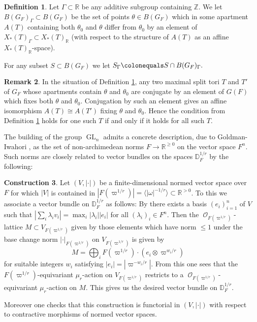 \documentclass{article}
\DeclareMathOperator{\Oc}{\mathcal{O}}
\DeclareMathOperator{\CO}{\mathcal{O}}
\DeclareMathOperator{\GL}{GL}
\newcommand{\BR}{{\mathbb{R}}}
\newcommand{\BZ}{{\mathbb{Z}}}
\newcommand{\Dr}[1][r]{\mathbb{D}_F^{1/#1}}
\newcommand{\defeq}{\colonequals}
\theoremstyle{definition}
\newtheorem{definition}{Definition}[section]
\newtheorem{construction}[definition]{Construction}
\newtheorem{rmk}[definition]{Remark}
\theoremstyle{plain}
\begin{document}
\begin{definition} \label{RationalPtDef}
    Let $\Gamma \subset \BR$ be any additive subgroup containing $\BZ$. We let $B(G_F)_\Gamma \subset B(G_F)$ be the set of points $\theta \in B(G_F)$ which in some apartment $A(T)$ containing both $\theta_0$ and $\theta$ differ from $\theta_0$ by an element of $X_*(T)_\Gamma \subset X_*(T)_\BR$ (with respect to the structure of $A(T)$ as an affine $X_*(T)_\BR$-space).

    For any subset $S \subset B(G_F)$ we let $S_\Gamma \defeq S \cap B(G_F)_\Gamma.$
\end{definition}
\begin{rmk}
    In the situation of Definition \ref{RationalPtDef}, any two maximal split tori $T$ and $T'$ of $G_F$ whose apartments contain $\theta$ and $\theta_0$ are conjugate by an element of $G(F)$ which fixes both $\theta$ and $\theta_0$. Conjugation by such an element gives an affine isomorphism $A(T) \cong A(T')$ fixing $\theta$ and $\theta_0$. Hence the condition from Definition \ref{RationalPtDef} holds for one such $T$ if and only if it holds for all such $T$. 
\end{rmk}



The building of the group $\GL_n$ admits a concrete description, due to Goldman-Iwahori \cite{MR0144889}, as the set of non-archimedean norms $F \to \BR^{\geq 0}$ on the vector space $F^n$. Such norms are closely related to vector bundles on the spaces $\Dr$ by the following:

\begin{construction} \label{NormTOVB}
    Let $(V,|\cdot|)$ be a finite-dimensional normed vector space over $F$ for which $|V|$ is contained in $|F(\varpi^{1/r})|=\langle |\omega|^{-1/r} \rangle \subset \BR^{>0}$. To this we associate a vector bundle on $\Dr$ as follows: 
    By \cite[Prop. 1.1]{MR0144889} there exists a basis $(e_i)_{i=1}^n$ of $V$ such that $| \sum_i \lambda_i v_i|=\max_i |\lambda_i| |e_i|$ for all $(\lambda_i)_i \in F^n$. Then the $\Oc_{F(\varpi^{1/r})}$-lattice $M \subset V_{F(\varpi^{1/r})}$ given by those elements which have norm $\leq 1$ under the base change norm $|\cdot|_{F(\varpi^{1/r})}$ on $V_{F(\varpi^{1/r})}$ is given by
    \begin{equation*}
        M = \bigoplus_i {F(\varpi^{1/r})} \cdot (e_i \otimes \varpi^{w_i/r})
    \end{equation*}
    for suitable integers $w_i$ satisfying $|e_i|=|\varpi^{-w_i/r}|$. From this one sees that the ${F(\varpi^{1/r})}$-equivariant $\mu_r$-action on $V_{F(\varpi^{1/r})}$ restricts to a $\CO_{F(\varpi^{1/r})}$-equivariant $\mu_r$-action on $M$. This gives us the desired vector bundle on $\Dr.$

    Moreover one checks that this construction is functorial in $(V,|\cdot|)$ with respect to contractive morphisms of normed vector spaces.
\end{construction}
\end{document}
